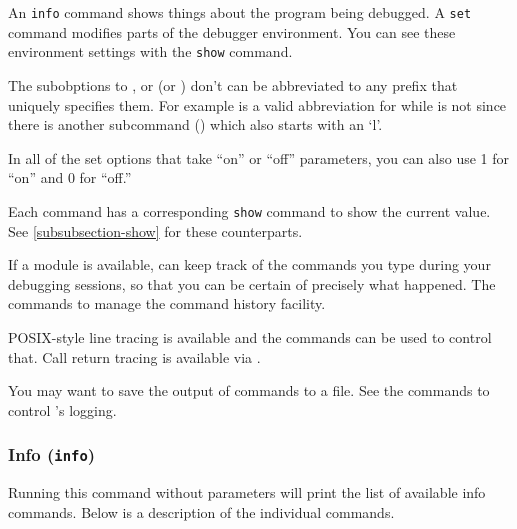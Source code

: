 An {\tt info} command shows things about the program being debugged. A
{\tt set} command modifies parts of the debugger environment. You can
see these environment settings with the {\tt show} command.

The subobptions to , or  (or ) don't
can be abbreviated to any prefix that uniquely specifies them. For
example  is a valid abbreviation for 
while  is not since there is another subcommand
() which also starts with an `l'.

In all of the set options that take ``on'' or ``off'' parameters, you
can also use 1 for ``on'' and 0 for ``off.''

Each command has a corresponding {\tt show} command to show the current
value. See \ref{subsubsection-show} for these counterparts.

If a
module is available,  can keep track of the commands you
type during your debugging sessions, so that you can be certain of
precisely what happened.  The  commands to manage
the command history facility.

POSIX-style line tracing is available and the 
commands can be used to control that. Call return tracing is available
via .

You may want to save the output of  commands to a file.
See the  commands to control 's logging.

\subsubsection{Info ({\tt info})\label{subsubsection-info}}

Running this command without parameters will print the list of
available info commands. Below is a description of the individual
commands.

